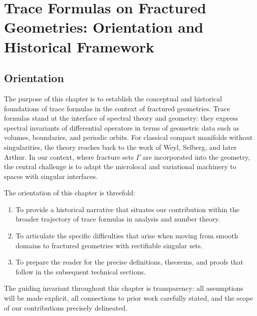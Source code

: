 \chapter{Trace Formulas on Fractured Geometries: Orientation and Historical Framework}
\label{ch:trace-formulas}


\section*{Orientation}

The purpose of this chapter is to establish the conceptual and historical foundations
of trace formulas in the context of fractured geometries. Trace formulas stand at the
interface of spectral theory and geometry: they express spectral invariants of
differential operators in terms of geometric data such as volumes, boundaries, and
periodic orbits. For classical compact manifolds without singularities, the theory
reaches back to the work of Weyl, Selberg, and later Arthur. In our context, where
fracture sets $\Gamma$ are incorporated into the geometry, the central challenge is
to adapt the microlocal and variational machinery to spaces with singular interfaces.

The orientation of this chapter is threefold:

\begin{enumerate}[label=(\roman*)]
\item To provide a historical narrative that situates our contribution within the
broader trajectory of trace formulas in analysis and number theory.
\item To articulate the specific difficulties that arise when moving from smooth
domains to fractured geometries with rectifiable singular sets.
\item To prepare the reader for the precise definitions, theorems, and proofs that
follow in the subsequent technical sections.
\end{enumerate}

The guiding invariant throughout this chapter is transparency: all assumptions will be
made explicit, all connections to prior work carefully stated, and the scope of our
contributions precisely delineated.


